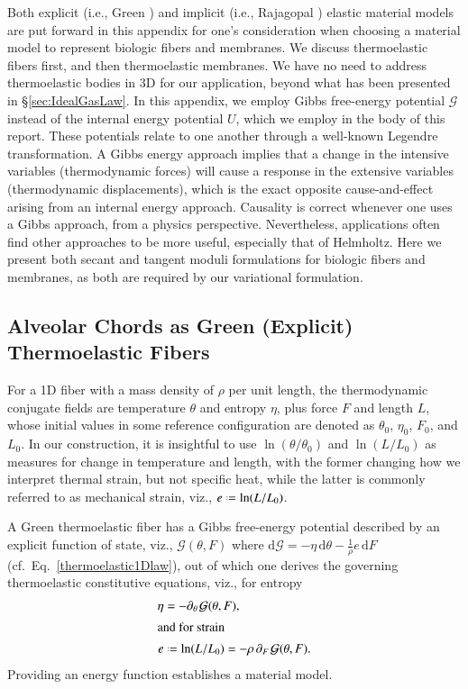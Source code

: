 \label{appImplicitElasticity}

Both explicit (i.e., Green \cite{Green41}) and implicit (i.e., Rajagopal \cite{Rajagopal03}) elastic material models are put forward in this appendix for one's consideration when choosing a material model to represent biologic fibers and membranes.  We discuss thermo\-elastic fibers first, and then thermo\-elastic membranes.  We have no need to address thermo\-elastic bodies in 3D for our application, beyond what has been presented in \S\ref{sec:IdealGasLaw}.  In this appendix, we employ Gibbs free-energy potential $\mathcal{G}$ instead of the internal energy potential $U$, which we employ in the body of this report.  These potentials relate to one another through a well-known Legendre transformation.  A Gibbs energy approach implies that a change in the intensive variables (thermo\-dynamic forces) will cause a response in the extensive variables (thermo\-dynamic displacements), which is the exact opposite cause-and-effect arising from an internal energy approach.  Causality is correct whenever one uses a Gibbs approach, from a physics perspective.  Nevertheless, applications often find other approaches to be more useful, especially that of Helmholtz.  Here we present both secant and tangent moduli formulations for biologic fibers and membranes, as both are required by our variational formulation.

\subsection{Alveolar Chords as Green (Explicit) Thermoelastic Fibers}

For a 1D fiber with a mass density of $\rho$ per unit length, the thermo\-dynamic conjugate fields are temperature $\theta$ and entropy $\eta$, plus force $F$ and length $L$, whose initial values in some reference configuration are denoted as $\theta_0$, $\eta_0$, $F_0$, and $L_0$.  In our construction, it is insightful to use $\ln (\theta / \theta_0)$ and $\ln (L/L_0)$ as measures for change in temperature and length, with the former changing how we interpret thermal strain, but not specific heat, while the latter is commonly referred to as mechanical strain, viz., $e \defeq \ln (L/L_0)$.

A Green thermo\-elastic fiber has a Gibbs free-energy potential described by an explicit function of state, viz., $\mathcal{G} (\theta , F)$ where $\mathrm{d} \mathcal{G} = -\eta \, \mathrm{d} \theta - \tfrac{1}{\rho} e \, \mathrm{d}F$ (cf.~Eq.~\ref{thermoelastic1Dlaw}), out of which one derives the governing thermo\-elastic constitutive equations, viz., for entropy
\begin{subequations}
    \label{thermoelasticFiber}
    \begin{align}
    \eta & = - \partial_{\theta\,} \mathcal{G} (\theta , F) ,
    \label{fiberEntropy} \\
    \intertext{and for strain}
    e & \defeq \ln ( L / L_0 ) = -\rho \, \partial_{F\,} \mathcal{G} (\theta, F) . 
    \label{fiberStrain}
    \end{align}
\end{subequations}
Providing an energy function establishes a material model.


